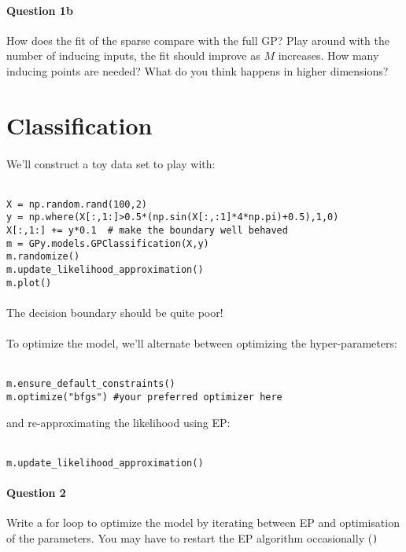 \documentclass{article}
\newcommand{\mintinline}[1]{\colorbox{bg}{\lstinline[basicstyle=\ttfamily]{#1}}}
\begin{document}
\paragraph{Question 1b}
How does the fit of the sparse compare with the full GP? Play around with the number of inducing inputs, the fit should improve as $M$ increases. How many inducing points are needed? What do you think happens in higher dimensions?

\section{Classification}
\paragraph{}
We'll construct a toy data set to play with:\\ \ \\
\begin{verbatim}
X = np.random.rand(100,2)
y = np.where(X[:,1:]>0.5*(np.sin(X[:,:1]*4*np.pi)+0.5),1,0)
X[:,1:] += y*0.1  # make the boundary well behaved
m = GPy.models.GPClassification(X,y)
m.randomize()
m.update_likelihood_approximation()
m.plot()
\end{verbatim}

\paragraph{}
The decision boundary should be quite poor!  

\paragraph{}
To optimize the model, we'll
alternate between optimizing the hyper-parameters:\\ \ \\
\begin{verbatim}
m.ensure_default_constraints()
m.optimize("bfgs") #your preferred optimizer here
\end{verbatim}

and re-approximating the likelihood using EP:\\ \ \\
\begin{verbatim}
m.update_likelihood_approximation()
\end{verbatim}

\paragraph{Question 2}
Write a for loop to optimize the model by iterating between EP and optimisation of the parameters. You may have to restart the EP algorithm occasionally (\texttt)
\end{document}
